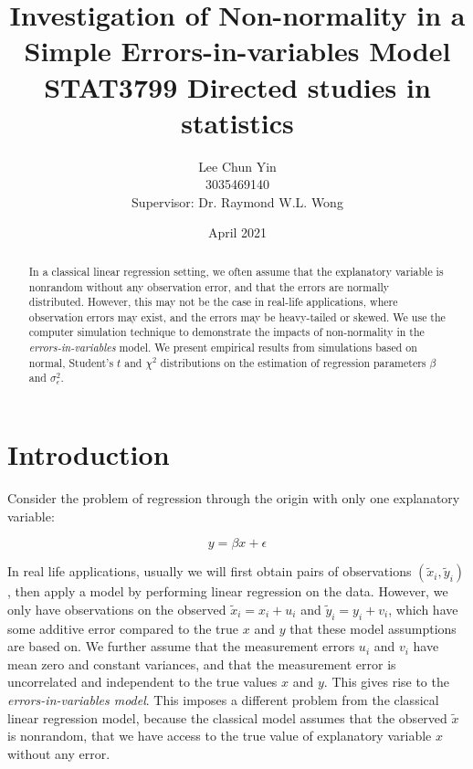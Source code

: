 \documentclass{article}
\title{Investigation of Non-normality in a Simple Errors-in-variables Model\\[1cm]
STAT3799 Directed studies in statistics}
\author{Lee Chun Yin\\
3035469140\\[1cm]{\small Supervisor: Dr. Raymond W.L. Wong}
}
\date{April 2021}
\begin{document}
\maketitle

\begin{abstract}

In a classical linear regression setting, we often assume that the explanatory variable is nonrandom without any observation error, and that the errors are normally distributed.
However, this may not be the case in real-life applications, where observation errors may exist, and the errors may be heavy-tailed or skewed.
We use the computer simulation technique to demonstrate the impacts of non-normality in the \textit{errors-in-variables} model.
We present empirical results from simulations based on normal, Student's $t$ and $\chi^2$ distributions on the estimation of regression parameters $\beta$ and $\sigma^2_\epsilon$.

\end{abstract}

\section{Introduction}

Consider the problem of regression through the origin with only one explanatory variable:

\begin{equation}
y = \beta x + \epsilon
\end{equation}

In real life applications, usually we will first obtain pairs of observations $(\tilde{x}_i, \tilde{y}_i)$, then apply a model by performing linear regression on the data.
However, we only have observations on the observed $\tilde{x}_i = x_i + u_i$ and $\tilde{y}_i = y_i + v_i$, which have some additive error compared to the true $x$ and $y$ that these model assumptions are based on.
We further assume that the measurement errors $u_i$ and $v_i$ have mean zero and constant variances, and that the measurement error is uncorrelated and independent to the true values $x$ and $y$.
This gives rise to the \textit{errors-in-variables model}.
This imposes a different problem from the classical linear regression model, because the classical model assumes that the observed $\tilde{x}$ is nonrandom, that we have access to the true value of explanatory variable $x$ without any error. 
\end{document}
